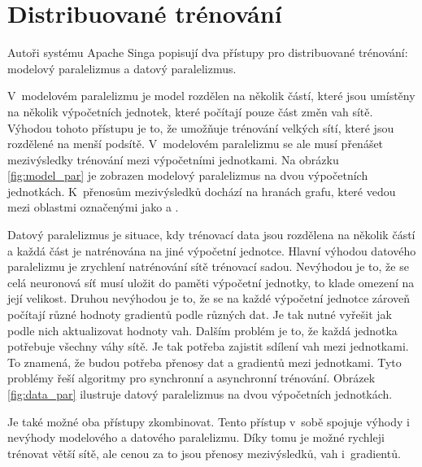 \section{Distribuované trénování}
\label{sec:dist_train}

Autoři systému Apache Singa \cite{Ooi2015} popisují dva přístupy pro distribuované trénování: modelový paralelizmus a datový paralelizmus.

V~modelovém paralelizmu je model rozdělen na několik částí, které jsou umístěny na několik výpočetních jednotek, které počítají pouze část změn vah sítě.
Výhodou tohoto přístupu je to, že umožňuje trénování velkých sítí, které jsou rozdělené na menší podsítě.
V~modelovém paralelizmu se ale musí přenášet mezivýsledky trénování mezi výpočetními jednotkami.
Na obrázku \ref{fig:model_par} je zobrazen modelový paralelizmus na dvou výpočetních jednotkách.
K~přenosům mezivýsledků dochází na hranách grafu, které vedou mezi oblastmi označenými jako  a .

Datový paralelizmus je situace, kdy trénovací data jsou rozdělena na několik částí a každá část je natrénována na jiné výpočetní jednotce.
Hlavní výhodou datového paralelizmu je zrychlení natrénování sítě trénovací sadou.
Nevýhodou je to, že se celá neuronová síť musí uložit do paměti výpočetní jednotky, to klade omezení na její velikost.
Druhou nevýhodou je to, že se na každé výpočetní jednotce zároveň počítají různé hodnoty gradientů podle různých dat.
Je tak nutné vyřešit jak podle nich aktualizovat hodnoty vah.
Dalším problém je to, že každá jednotka potřebuje všechny váhy sítě.
Je tak potřeba zajistit sdílení vah mezi jednotkami.
To znamená, že budou potřeba přenosy dat a gradientů mezi jednotkami.
Tyto problémy řeší algoritmy pro synchronní a asynchronní trénování.
Obrázek \ref{fig:data_par} ilustruje datový paralelizmus na dvou výpočetních jednotkách.

Je také možné oba přístupy zkombinovat.
Tento přístup v~sobě spojuje výhody i nevýhody modelového a datového paralelizmu.
Díky tomu je možné rychleji trénovat větší sítě, ale cenou za to jsou přenosy mezivýsledků, vah i~gradientů.


